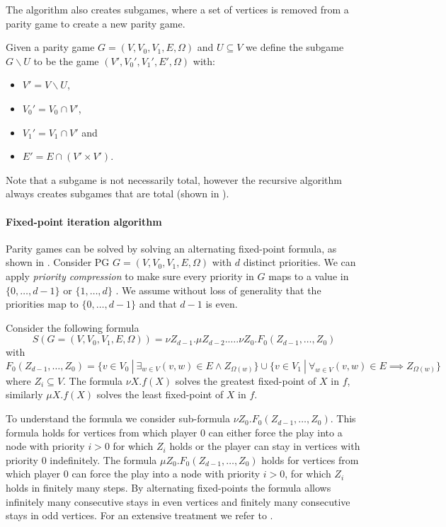 The algorithm also creates subgames, where a set of vertices is removed from a parity game to create a new parity game.

\begin{definition}
	\label{def_org_subgame}
	Given a parity game $G = (V,V_0,V_1, E,\Omega)$ and $U \subseteq V$ we define the subgame $G \backslash U$ to be the game $(V', V_0', V_1', E', \Omega)$ with:
	\begin{itemize}
		\item $V' = V \backslash U$,
		\item $V_0' = V_0 \cap V'$,
		\item $V_1' = V_1 \cap V'$ and
		\item $E' = E \cap (V' \times V')$.
	\end{itemize}
\end{definition}

Note that a subgame is not necessarily total, however the recursive algorithm always creates subgames that are total (shown in \cite{ZIELONKA1998135}).

\paragraph{Fixed-point iteration algorithm}
Parity games can be solved by solving an alternating fixed-point formula, as shown in \cite{WALUKIEWICZ2002311}. Consider PG $G = (V,V_0,V_1, E, \Omega)$ with $d$ distinct priorities. We can apply \textit{priority compression} to make sure every priority in $G$ maps to a value in $\{0,\dots,d-1\}$ or $\{1, \dots, d\}$ \cite{SolvingInPractice,FPITE}. We assume without loss of generality that the priorities map to $\{0,\dots,d-1\}$ and that $d-1$ is even. 

Consider the following formula
\[ S(G = (V,V_0,V_1,E,\Omega)) = \nu Z_{d-1}. \mu Z_{d-2}. \dots . \nu Z_0. F_0(Z_{d-1},\dots,Z_0) \]
with
\[ F_0(Z_{d-1},\dots,Z_0) = \{ v \in V_0\ |\ \exists_{w\in V} (v,w) \in E \wedge Z_{\Omega(w)} \} \cup \{ v \in V_1\ |\ \forall_{w\in V} (v,w) \in E \implies Z_{\Omega(w)} \} \]
where $Z_i \subseteq V$. The formula $\nu X. f(X)$ solves the greatest fixed-point of $X$ in $f$, similarly $\mu X.f(X)$ solves the least fixed-point of $X$ in $f$.

To understand the formula we consider sub-formula $\nu Z_0. F_0(Z_{d-1},\dots,Z_0)$. This formula holds for vertices from which player $0$ can either force the play into a node with priority $i > 0$ for which $Z_i$ holds or the player can stay in vertices with priority $0$ indefinitely. The formula $\mu Z_0. F_0(Z_{d-1},\dots,Z_0)$ holds for vertices from which player $0$ can force the play into a node with priority $i > 0$, for which $Z_i$ holds in finitely many steps. By alternating fixed-points the formula allows infinitely many consecutive stays in even vertices and finitely many consecutive stays in odd vertices. For an extensive treatment we refer to \cite{WALUKIEWICZ2002311}.


